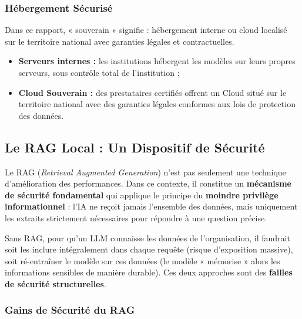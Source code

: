 \documentclass[12pt, a4paper]{report}
\begin{document}
\subsubsection{Hébergement Sécurisé}

Dans ce rapport, « souverain » signifie : hébergement interne ou cloud
localisé sur le territoire national avec garanties légales et
contractuelles.

\begin{itemize}
  \item \textbf{Serveurs internes :} les institutions hébergent les
        modèles sur leurs propres serveurs, sous contrôle total de
        l'institution ;
  \item \textbf{Cloud Souverain :} des prestataires certifiés offrent un
        Cloud situé sur le territoire national avec des garanties légales
        conformes aux lois de protection des données.
\end{itemize}

\subsection{Le RAG Local : Un Dispositif de Sécurité}

Le RAG (\textit{Retrieval Augmented Generation}) n'est pas seulement une
technique d'amélioration des performances. Dans ce contexte, il constitue
un \textbf{mécanisme de sécurité fondamental} qui applique le principe du
\textbf{moindre privilège informationnel} : l'IA ne reçoit jamais
l'ensemble des données, mais uniquement les extraits strictement
nécessaires pour répondre à une question précise.

\begin{tcolorbox}[cmrbox, title={Pourquoi le RAG est un Outil de Sécurité}]
Sans RAG, pour qu'un LLM connaisse les données de l'organisation, il
faudrait soit les inclure intégralement dans chaque requête (risque
d'exposition massive), soit ré-entraîner le modèle sur ces données
(le modèle « mémorise » alors les informations sensibles de manière
durable). Ces deux approches sont des \textbf{failles de sécurité
structurelles}.
\end{tcolorbox}

\subsubsection{Gains de Sécurité du RAG}
\end{document}
